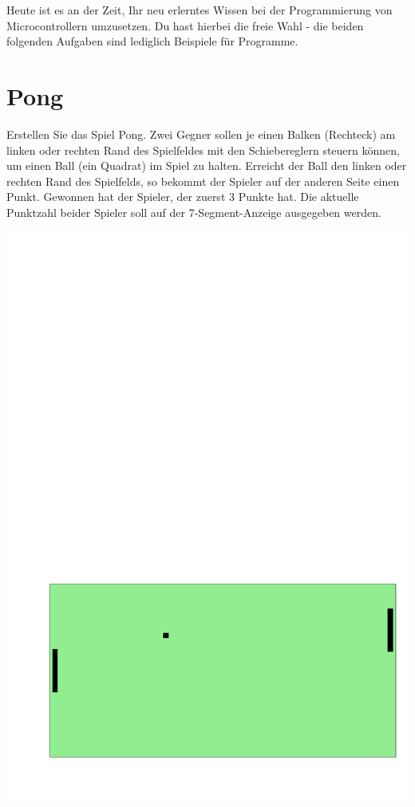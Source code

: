 

\newcommand{\tag}{6}

\cppSetTitle



\cppSetHeaderAndMakeTitle 


\noindent Heute ist es an der Zeit, Ihr neu erlerntes Wissen bei der Programmierung von Microcontrollern umzusetzen.
Du hast hierbei die freie Wahl - die beiden folgenden Aufgaben sind lediglich Beispiele für Programme.

\section{Pong}


Erstellen Sie das Spiel Pong.
Zwei Gegner sollen je einen Balken (Rechteck) am linken oder rechten Rand des Spielfeldes mit den Schiebereglern steuern können, um einen Ball (ein Quadrat) im Spiel zu halten.
Erreicht der Ball den linken oder rechten Rand des Spielfelds, so bekommt der Spieler auf der anderen Seite einen Punkt.
Gewonnen hat der Spieler, der zuerst 3 Punkte hat.
Die aktuelle Punktzahl beider Spieler soll auf der 7-Segment-Anzeige ausgegeben werden.
\begin{center}
\includegraphics[scale=0.4]{pong}
\end{center}
